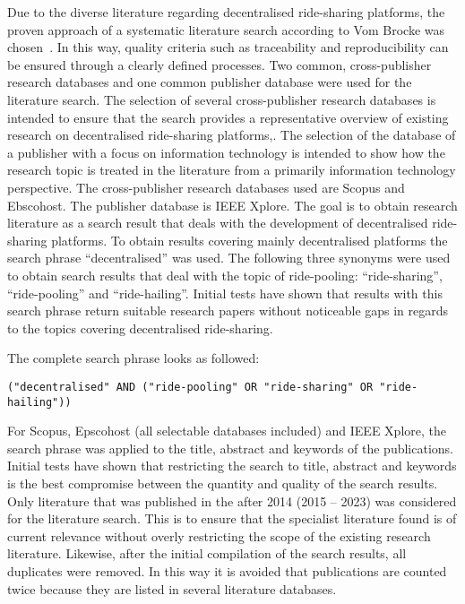 Due to the diverse literature regarding decentralised ride-sharing platforms, the proven approach of a systematic literature search according to Vom Brocke was chosen~\cite{vomBrocke.2009}. In this way, quality criteria such as traceability and reproducibility can be ensured through a clearly defined processes. Two common, cross-publisher research databases and one common publisher database were used for the literature search.
The selection of several cross-publisher research databases is intended to ensure that the search provides a representative overview of existing research on decentralised ride-sharing platforms,. The selection of the database of a publisher with a focus on information technology is intended to show how the research topic is treated in the literature from a primarily information technology perspective. The cross-publisher research databases used are Scopus and Ebscohost. The publisher database is IEEE Xplore.
The goal is to obtain research literature as a search result that deals with the development of decentralised ride-sharing platforms. To obtain results covering mainly decentralised platforms the search phrase ``decentralised'' was used. The following three synonyms were used to obtain search results that deal with the topic of ride-pooling: ``ride-sharing'', ``ride-pooling'' and ``ride-hailing''. Initial tests have shown that results with this search phrase return suitable research papers without noticeable gaps in regards to the topics covering decentralised ride-sharing.

The complete search phrase looks as followed:
\begin{verbatim}
("decentralised" AND ("ride-pooling" OR "ride-sharing" OR "ride-hailing"))
\end{verbatim}

For Scopus, Epscohost (all selectable databases included) and IEEE Xplore, the search phrase was applied to the title, abstract and keywords of the publications. Initial tests have shown that restricting the search to title, abstract and keywords is the best compromise between the quantity and quality of the search results. Only literature that was published in the after 2014 (2015 – 2023) was considered for the literature search. This is to ensure that the specialist literature found is of current relevance without overly restricting the scope of the existing research literature. Likewise, after the initial compilation of the search results, all duplicates were removed. In this way it is avoided that publications are counted twice because they are listed in several literature databases.

